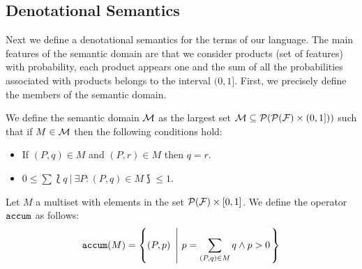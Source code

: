 \subsection{Denotational Semantics}
\label{sec:stat:den}

Next we define a denotational semantics for the terms of our language. The main features of the semantic domain are that we consider products (set of features) with probability,
each product appears one and the sum of all the probabilities
associated with products belongs to the interval $(0,1]$. First, we
precisely define the members of the semantic domain. 



\bdfn\label{def:den:pr}
We define the semantic domain ${\cal M}$ as the largest set ${\cal M}\subseteq{\cal P}({\cal P}({\cal F})\times
  (0,1]))$ such that if $M\in{\cal M}$ then the following
  conditions hold:
  \begin{itemize}
  \item If $(P,q)\in M$ and $(P,r)\in M$ then $q=r$.
  \item $0\leq \sum \lbag q \ | \ \exists P: (P,q)\in M\rbag \leq 1$.
  \end{itemize}


Let $M$ a multiset  with elements in the set ${\cal P}({\cal F})\times [0,1]$.
We define the operator $\mathtt{accum}$ as follows:
  $$\accum(M) = \left\{(P,p)\ \left| \ p=\sum_{(P,q)\in M}q \wedge p>0\right. \right\}$$
\edfn

